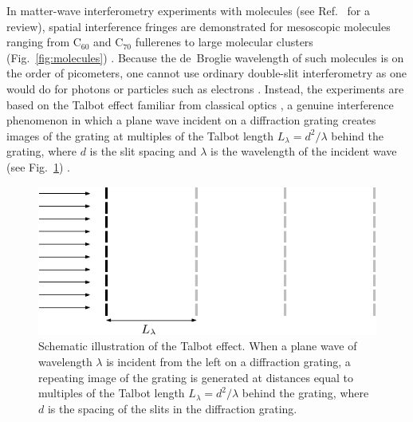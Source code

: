 \documentclass[3p,sort&compress]{elsarticle}
\begin{document}
In matter-wave interferometry experiments with molecules (see Ref.~\cite{Hornberger:2012:ii} for a review), spatial interference fringes are demonstrated for mesoscopic molecules ranging from C$_{60}$ and C$_{70}$ fullerenes \cite{Arndt:1999:rc} to large molecular clusters (Fig.~\ref{fig:molecules}) \cite{Gerlich:2011:aa,Eibenberger:2013:az}. Because the de~Broglie wavelength of such molecules is on the order of picometers, one cannot use ordinary double-slit interferometry as one would do for photons or particles such as electrons \cite{Jonsson:1961:rz,Jonsson:1974:rz,Tonomura:1989:as}. Instead, the experiments are based on the Talbot effect familiar from classical optics \cite{Mansuripur:2009:zz}, a genuine interference phenomenon in which a plane wave incident on a diffraction grating creates images of the grating at multiples of the Talbot length $L_\lambda = d^2/\lambda$ behind the grating, where $d$ is the slit spacing and $\lambda$ is the wavelength of the incident wave (see Fig.~\ref{fig:tbeff}) \cite{Mansuripur:2009:zz,Hackermuller:2003:uu}. 

\begin{figure}
\centering
\includegraphics[scale=1]{tbeff.pdf}
\caption{Schematic illustration of the Talbot effect. When a plane wave of wavelength $\lambda$ is incident from the left on a diffraction grating, a repeating image of the grating is generated at distances equal to multiples of the Talbot length $L_\lambda = d^2/\lambda$ behind the grating, where $d$ is the spacing of the slits in the diffraction grating.}
\label{fig:tbeff}
\end{figure}
\end{document}
